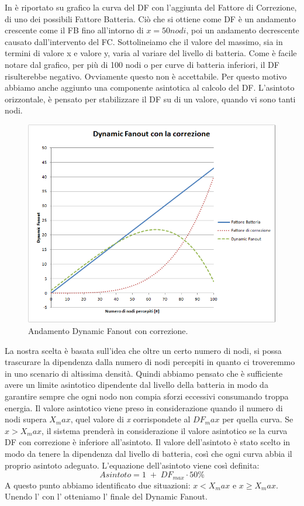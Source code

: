 In  è riportato su grafico la curva del DF con l'aggiunta del Fattore di Correzione, di uno dei possibili Fattore Batteria. Ciò che si ottiene come DF è un andamento crescente come il FB fino all'intorno di $\textit{x}=50 nodi$, poi un andamento decrescente causato dall'intervento del FC. Sottolineiamo che il valore del massimo, sia in termini di valore x e valore y, varia al variare del livello di batteria. Come è facile notare dal grafico, per più di 100 nodi o per curve di batteria inferiori, il DF risulterebbe negativo. Ovviamente questo non è accettabile. Per questo motivo abbiamo anche aggiunto una componente asintotica al calcolo del DF. L'asintoto orizzontale, è pensato per stabilizzare il DF su di un valore, quando vi sono tanti nodi.
\begin{figure}
	\centering
	\includegraphics[width=0.9\linewidth]{Images/grafici_usati/DF_andamento_teorico}
	\caption[DF teorico]{Andamento Dynamic Fanout con correzione.}
	\label{fig:DF_andamento_teorico}
\end{figure}
La nostra scelta è basata sull'idea che oltre un certo numero di nodi, si possa trascurare la dipendenza dalla numero di nodi percepiti in quanto ci troveremmo in uno scenario di altissima densità. Quindi abbiamo pensato che è sufficiente avere un limite asintotico dipendente dal livello della batteria in modo da garantire sempre che ogni nodo non compia sforzi eccessivi consumando troppa energia. Il valore asintotico viene preso in considerazione quando il numero di nodi supera $\textit{X}_max$, quel valore di \textit{x} corrispondete al $DF_max$ per quella curva. Se $\textit{x}>\textit{X}_max$, il sistema prenderà in considerazione il valore asintotico se la curva DF con correzione è inferiore all'asintoto.
Il valore dell'asintoto è stato scelto in modo da tenere la dipendenza dal livello di batteria, così che ogni curva abbia il proprio asintoto adeguato. L'equazione dell'asintoto viene così definita:
\begin{equation}
	\label{eq:df_asintoto}
	Asintoto = 1\;+\;DF_{max}\cdot 50\%
\end{equation}
A questo punto abbiamo identificato due situazioni: $\textit{x}<\textit{X}_max$ e $\textit{x}\geq \textit{X}_max$. Unendo l' con l' otteniamo l' finale del Dynamic Fanout.
\medskip

